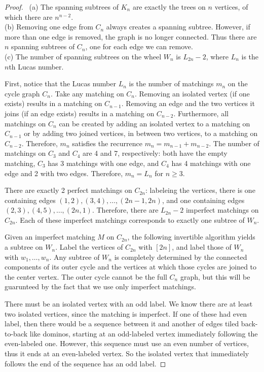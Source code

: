 \documentclass[12pt]{article}
\begin{document}
\begin{enumerate}[leftmargin=0cm,itemindent=.5cm,labelwidth=\itemindent,labelsep=0cm,align=left]
\begin{proof}
\ (a) The spanning subtrees of $K_n$ are exactly the trees on $n$ vertices, of which there are $n^{n-2}$.
\\
(b) Removing one edge from $C_n$ always creates a spanning subtree.  However, if more than one edge is removed, the graph is no longer connected.  Thus there are $n$ spanning subtrees of $C_n$, one for each edge we can remove.
\\
(c) The number of spanning subtrees on the wheel $W_n$ is $L_{2n} - 2$, where $L_n$ is the $n$th Lucas number.

First, notice that the Lucas number $L_n$ is the number of matchings $m_n$ on the cycle graph $C_n$. Take any matching on $C_n$.  Removing an isolated vertex (if one exists) results in a matching on $C_{n-1}$.  Removing an edge and the two vertices it joins (if an edge exists) results in a matching on $C_{n-2}$.  Furthermore, all matchings on $C_n$ can be created by adding an isolated vertex to a matching on $C_{n-1}$ or by adding two joined vertices, in between two vertices, to a matching on $C_{n-2}$.  Therefore, $m_n$ satisfies the recurrence $m_n = m_{n-1} + m_{n-2}$.  The number of matchings on $C_3$ and $C_4$ are 4 and 7, respectively: both have the empty matching, $C_3$ has 3 matchings with one edge, and $C_4$ has 4 matchings with one edge and 2 with two edges.  Therefore, $m_n = L_n$ for $n\geq 3$.

There are exactly 2 perfect matchings on $C_{2n}$: labeleing the vertices, there is one containing edges $(1,2), (3,4), \dots , (2n-1, 2n)$, and one containing edges $(2,3), (4,5), \dots , (2n,1)$.  Therefore, there are $L_{2n} - 2$ imperfect matchings on $C_{2n}$.  Each of these imperfect matchings corresponds to exactly one subtree of $W_n$.

Given an imperfect matching $M$ on $C_{2n}$, the following invertible algorithm yields a subtree on $W_n$.  Label the vertices of $C_{2n}$ with $[2n]$, and label those of $W_n$ with $w_1, \dots , w_n$.  Any subtree of $W_n$ is completely determined by the connected components of its outer cycle and the vertices at which those cycles are joined to the center vertex.  The outer cycle cannot be the full $C_n$ graph, but this will be guarunteed by the fact that we use only imperfect matchings.

There must be an isolated vertex with an odd label.  We know there are at least two isolated vertices, since the matching is imperfect.  If one of these had even label, then there would be a sequence between it and another of edges tiled back-to-back like dominos, starting at an odd-labeled vertex immediately following the even-labeled one.  However, this sequence must use an even number of vertices, thus it ends at an even-labeled vertex.  So the isolated vertex that immediately follows the end of the sequence has an odd label.


\end{proof}
\end{enumerate}
\end{document}
